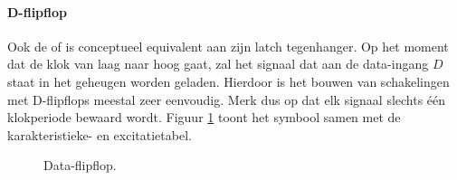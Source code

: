 \paragraph{D-flipflop} Ook de  of  is conceptueel equivalent aan zijn latch tegenhanger. Op het moment dat de klok van laag naar hoog gaat, zal het signaal dat aan de data-ingang $D$ staat in het geheugen worden geladen. Hierdoor is het bouwen van schakelingen met D-flipflops meestal zeer eenvoudig. Merk dus op dat elk signaal slechts \'e\'en klokperiode bewaard wordt. Figuur \ref{fig:dataFlipflop} toont het symbool samen met de karakteristieke- en excitatietabel.
\begin{figure}[hbt]
\centering
{}
\caption{Data-flipflop.}
\label{fig:dataFlipflop}
\end{figure}
